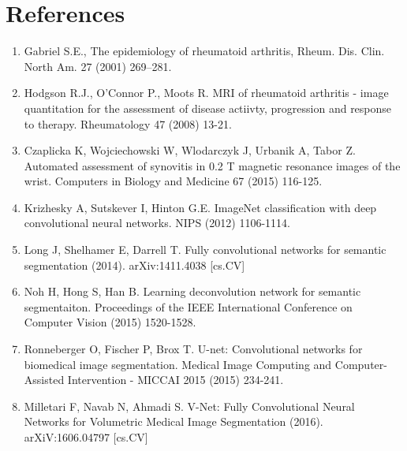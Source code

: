 \documentclass[11pt]{article}
\begin{document}
\section*{References}
\begin{enumerate}

\item \label{gab} Gabriel S.E., The epidemiology of rheumatoid arthritis, Rheum. Dis. Clin. North
Am. 27 (2001) 269–281.

\item \label{hodge} Hodgson R.J., O'Connor P., Moots R. MRI of rheumatoid arthritis - image quantitation for the assessment of disease actiivty, progression and response to therapy. Rheumatology 47 (2008) 13-21. 

\item \label{cza} Czaplicka K, Wojciechowski W, Wlodarczyk J, Urbanik A, Tabor Z. Automated assessment of synovitis in 0.2 T magnetic resonance images of the wrist. Computers in Biology and Medicine 67 (2015) 116-125. 

\item \label{kriz} Krizhesky A, Sutskever I, Hinton G.E. ImageNet classification with deep convolutional neural networks. NIPS (2012) 1106-1114. 

\item \label{long} Long J, Shelhamer E, Darrell T. Fully convolutional networks for semantic segmentation (2014). arXiv:1411.4038 [cs.CV]

\item \label{noh} Noh H, Hong S, Han B. Learning deconvolution network for semantic segmentaiton. Proceedings of the IEEE International Conference on Computer Vision (2015) 1520-1528.

\item \label{unet} Ronneberger O, Fischer P, Brox T. U-net: Convolutional networks for biomedical image segmentation. Medical Image Computing and Computer-Assisted Intervention - MICCAI 2015 (2015) 234-241.

\item \label{vnet} Milletari F, Navab N, Ahmadi S. V-Net: Fully Convolutional Neural Networks for Volumetric Medical Image Segmentation (2016). arXiV:1606.04797 [cs.CV] 
\end{enumerate}
\end{document}
